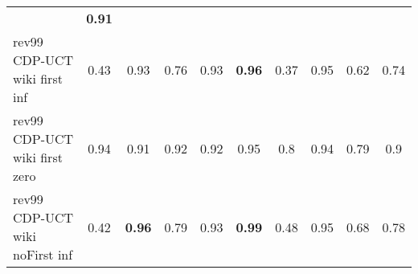\documentclass{article}
\begin{document}
\begin{tabular}{|l|r@{$\pm$}rr@{$\pm$}rr@{$\pm$}rr@{$\pm$}rr@{$\pm$}rr@{$\pm$}rr@{$\pm$}rr@{$\pm$}rr@{$\pm$}r|}
& \multicolumn{2}{c|}{\textbf{0.91}}
\\
rev99 CDP-UCT wiki first inf
& \multicolumn{2}{c}{0.43}
& \multicolumn{2}{c}{0.93}
& \multicolumn{2}{c}{0.76}
& \multicolumn{2}{c}{0.93}
& \multicolumn{2}{c}{\textbf{0.96}}
& \multicolumn{2}{c}{0.37}
& \multicolumn{2}{c}{0.95}
& \multicolumn{2}{c}{0.62}
& \multicolumn{2}{c|}{0.74}
\\
rev99 CDP-UCT wiki first zero
& \multicolumn{2}{c}{0.94}
& \multicolumn{2}{c}{0.91}
& \multicolumn{2}{c}{0.92}
& \multicolumn{2}{c}{0.92}
& \multicolumn{2}{c}{0.95}
& \multicolumn{2}{c}{0.8}
& \multicolumn{2}{c}{0.94}
& \multicolumn{2}{c}{0.79}
& \multicolumn{2}{c|}{0.9}
\\
rev99 CDP-UCT wiki noFirst inf
& \multicolumn{2}{c}{0.42}
& \multicolumn{2}{c}{\textbf{0.96}}
& \multicolumn{2}{c}{0.79}
& \multicolumn{2}{c}{0.93}
& \multicolumn{2}{c}{\textbf{0.99}}
& \multicolumn{2}{c}{0.48}
& \multicolumn{2}{c}{0.95}
& \multicolumn{2}{c}{0.68}
& \multicolumn{2}{c|}{0.78}
\\
\hline
\end{tabular}%

\bigskip
\end{document}
